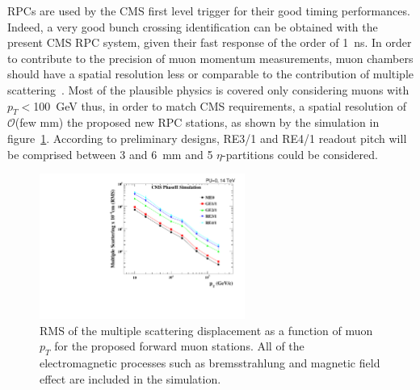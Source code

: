 RPCs are used by the CMS first level trigger for their good timing performances. Indeed, a very good bunch crossing identification can be obtained with the present CMS RPC system, given their fast response of the order of \SI{1}{ns}. In order to contribute to the precision of muon momentum measurements, muon chambers should have a spatial resolution less or comparable to the contribution of multiple scattering~\cite{MUONTDR}. Most of the plausible physics is covered only considering muons with $p_T<$\SI{100}{GeV} thus, in order to match CMS requirements, a spatial resolution of $\mathcal{O}$(few $\mathrm{mm}$) the proposed new RPC stations, as shown by the simulation in figure~\ref{fig:MultiScat}. According to preliminary designs, RE3/1 and RE4/1 readout pitch will be comprised between 3 and \SI{6}{mm} and 5 $\eta$-partitions could be considered.

\begin{figure}[H]
	\centering
	\includegraphics[width=0.6\textwidth]{fig/chapt2/MS_allstations.pdf}
	\caption{\label{fig:MultiScat}  RMS of the multiple scattering displacement as a function of muon $p_T$ for the  proposed forward muon stations. All of the electromagnetic processes such as bremsstrahlung and magnetic field effect are included in the simulation.}
\end{figure}

\clearpage{\pagestyle{empty}\cleardoublepage}

